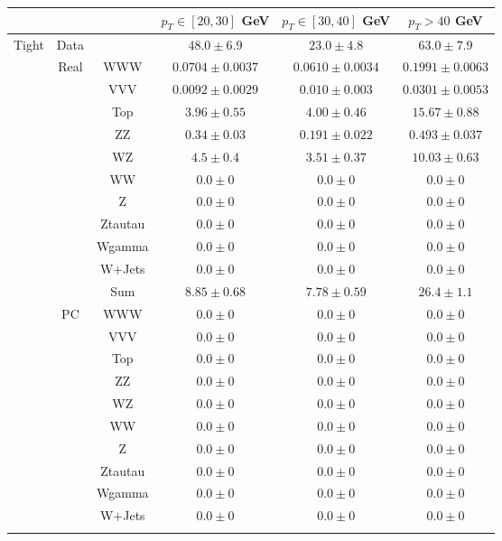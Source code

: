 \small
\begin{tabular}{|c|cc||c|c|c|}
\hline
\multicolumn{3}{|c||}{} & $p_{T}\in[20,30]$ GeV & $p_{T}\in[30,40]$ GeV & $p_{T} > 40$ GeV\\ 
\hline
\hline
\multirow{23}{*}{Tight} & Data & &  $48.0 \pm 6.9$ &  $23.0 \pm 4.8$ &  $63.0 \pm 7.9$\\ 
\cline{2-6}

&\multirow{11}{*}{Real} &WWW &  $0.0704 \pm 0.0037$ &  $0.0610 \pm 0.0034$ &  $0.1991 \pm 0.0063$\\ 
&& VVV &  $0.0092 \pm 0.0029$ &  $0.010 \pm 0.003$ &  $0.0301 \pm 0.0053$\\ 
&& Top &  $3.96 \pm 0.55$ &  $4.00 \pm 0.46$ &  $15.67 \pm 0.88$\\ 
&& ZZ &  $0.34 \pm 0.03$ &  $0.191 \pm 0.022$ &  $0.493 \pm 0.037$\\ 
&& WZ &  $4.5 \pm 0.4$ &  $3.51 \pm 0.37$ &  $10.03 \pm 0.63$\\ 
&& WW &  $0.0 \pm 0$ &  $0.0 \pm 0$ &  $0.0 \pm 0$\\ 
&& Z &  $0.0 \pm 0$ &  $0.0 \pm 0$ &  $0.0 \pm 0$\\ 
&& Ztautau &  $0.0 \pm 0$ &  $0.0 \pm 0$ &  $0.0 \pm 0$\\ 
&& Wgamma &  $0.0 \pm 0$ &  $0.0 \pm 0$ &  $0.0 \pm 0$\\ 
&& W+Jets &  $0.0 \pm 0$ &  $0.0 \pm 0$ &  $0.0 \pm 0$\\ 
\cline{3-6}
&& Sum &  $8.85 \pm 0.68$ &  $7.78 \pm 0.59$ &  $26.4 \pm 1.1$\\ 
\cline{2-6}
\cline{2-6}
&\multirow{11}{*}{PC} &WWW &  $0.0 \pm 0$ &  $0.0 \pm 0$ &  $0.0 \pm 0$\\ 
&& VVV &  $0.0 \pm 0$ &  $0.0 \pm 0$ &  $0.0 \pm 0$\\ 
&& Top &  $0.0 \pm 0$ &  $0.0 \pm 0$ &  $0.0 \pm 0$\\ 
&& ZZ &  $0.0 \pm 0$ &  $0.0 \pm 0$ &  $0.0 \pm 0$\\ 
&& WZ &  $0.0 \pm 0$ &  $0.0 \pm 0$ &  $0.0 \pm 0$\\ 
&& WW &  $0.0 \pm 0$ &  $0.0 \pm 0$ &  $0.0 \pm 0$\\ 
&& Z &  $0.0 \pm 0$ &  $0.0 \pm 0$ &  $0.0 \pm 0$\\ 
&& Ztautau &  $0.0 \pm 0$ &  $0.0 \pm 0$ &  $0.0 \pm 0$\\ 
&& Wgamma &  $0.0 \pm 0$ &  $0.0 \pm 0$ &  $0.0 \pm 0$\\ 
&& W+Jets &  $0.0 \pm 0$ &  $0.0 \pm 0$ &  $0.0 \pm 0$\\ 
\cline{3-6}

\end{tabular}
